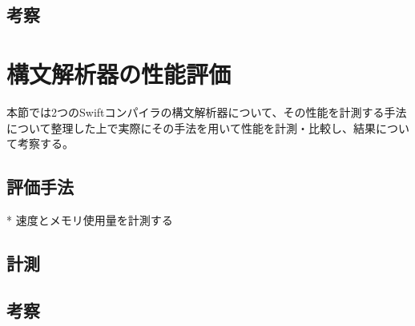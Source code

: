 \subsection{考察}


\section{構文解析器の性能評価}

本節では2つのSwiftコンパイラの構文解析器について、その性能を計測する手法について整理した上で実際にその手法を用いて性能を計測・比較し、結果について考察する。

\subsection{評価手法}

* 速度とメモリ使用量を計測する

\subsection{計測}

\subsection{考察}

